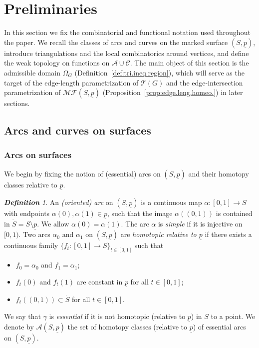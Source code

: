\documentclass[11pt, letterpaper]{amsart}
\theoremstyle{definition}
\theoremstyle{remark}
\newtheorem{definition}[theorem]{\rm\bf Definition}
\newcommand{\up}{\underline{p}}
\newcommand{\Sp}{(S,\up)}
\newcommand{\cMFp}{\mathcal{MF} (S,\up)}
\newcommand{\cA}{\mathcal{A}}
\newcommand{\cAC}{\mathcal{A} \cup \mathcal{C}}
\newcommand{\cT}{\mathcal{T}}
\newcommand{\DEF}{} \newcommand{\WARN}{\textcolor{red}} \newcommand{\ALT}{\textcolor{brown}} \newcommand{\TODO}{\textcolor{teal}} %
\numberwithin{equation}{section}
\begin{document}
 \section{Preliminaries}
    \label{sec:preliminary}

In this section we fix the combinatorial and functional notation used throughout the paper. 
We recall the classes of arcs and curves on the marked surface \(\Sp\), introduce triangulations and the local combinatorics around vertices, and define the weak topology on functions on \(\cAC\). 
The main object of this section is the admissible domain \(\Omega_G\) (Definition~\ref{def:tri.ineq.region}), which will serve as the target of the edge-length parametrization of \(\cT(G)\) and the edge-intersection parametrization of \(\cMFp\)
(Proposition~\ref{prop:edge.leng.homeo.}) in later sections.




\subsection{Arcs and curves on surfaces}


\subsubsection{Arcs on surfaces}

We begin by fixing the notion of (essential) arcs on \(\Sp\) and their homotopy classes relative to \(\up\).

\begin{definition}
An \DEF{\em (oriented) arc} on \(\Sp\) is a continuous map \(\alpha \colon [0,1] \to S\) with endpoints \(\alpha(0), \alpha(1) \in \up\), such that the image \(\alpha((0,1))\) is contained in \(\dot{S} = S \setminus \up\). 
We allow \(\alpha(0) = \alpha(1)\).
The arc \(\alpha\) is \DEF{\em simple} if it is injective on \([0,1)\).
Two arcs \(\alpha_0\) and \(\alpha_1\) on \(\Sp\) are \DEF{\em homotopic relative to \(\up\)} if there exists a continuous family \(\{ f_t \colon [0,1] \to S \}_{t \in [0,1]}\) such that
\begin{itemize}
  \item \(f_0 = \alpha_0\) and \(f_1 = \alpha_1\);
  \item \(f_t(0)\) and \(f_t(1)\) are constant in \(\up\) for all \(t \in [0,1]\);
  \item \(f_t((0,1)) \subset \dot{S}\) for all \(t \in [0,1]\).
\end{itemize}
We say that $\gamma$ is \DEF{\em essential} if it is not homotopic (relative to $\up$) in $S$ to a point.
We denote by \(\cA\Sp\) the set of homotopy classes (relative to \(\up\)) of essential arcs on \(\Sp\).
\end{definition}
\end{document}
